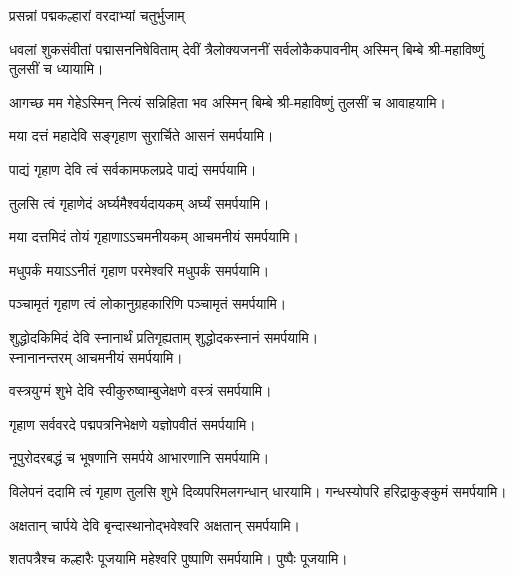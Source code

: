 \begin{center}

{प्रसन्नां पद्मकल्हारां वरदाभ्यां चतुर्भुजाम्}

{धवलां शुकसंवीतां पद्मासननिषेविताम्}
{देवीं त्रैलोक्यजननीं सर्वलोकैकपावनीम्}
अस्मिन् बिम्बे श्री-महाविष्णुं तुलसीं च ध्यायामि।

{आगच्छ मम गेहेऽस्मिन् नित्यं सन्निहिता भव}
अस्मिन् बिम्बे श्री-महाविष्णुं तुलसीं च आवाहयामि।
\medskip

\medskip
{}
{मया दत्तं महादेवि सङ्गृहाण सुरार्चिते}
 आसनं समर्पयामि।\medskip

{पाद्यं गृहाण देवि त्वं सर्वकामफलप्रदे}
 पाद्यं समर्पयामि।\medskip

{तुलसि त्वं गृहाणेदं अर्घ्यमैश्वर्यदायकम्}
 अर्घ्यं समर्पयामि।\medskip

{मया दत्तमिदं तोयं गृहाणाऽऽचमनीयकम्}
 आचमनीयं समर्पयामि।\medskip

{मधुपर्कं मयाऽऽनीतं गृहाण परमेश्वरि}
मधुपर्कं समर्पयामि।\medskip

{पञ्चामृतं गृहाण त्वं लोकानुग्रहकारिणि}
पञ्चामृतं समर्पयामि।\medskip


{शुद्धोदकिमिदं देवि स्नानार्थं प्रतिगृह्यताम्}
 शुद्धोदकस्नानं समर्पयामि।\\
स्नानानन्तरम् आचमनीयं समर्पयामि।\medskip

 {वस्त्रयुग्मं शुभे देवि स्वीकुरुष्वाम्बुजेक्षणे}
 वस्त्रं समर्पयामि।\medskip

{गृहाण सर्ववरदे पद्मपत्रनिभेक्षणे}
 यज्ञोपवीतं समर्पयामि।\medskip

{नूपुरोदरबद्धं च भूषणानि समर्पये}
आभारणानि समर्पयामि।\medskip
 
{विलेपनं ददामि त्वं गृहाण तुलसि शुभे}
 दिव्यपरिमलगन्धान् धारयामि। गन्धस्योपरि हरिद्राकुङ्कुमं समर्पयामि। 

{अक्षतान् चार्पये देवि बृन्दास्थानोद्भवेश्वरि}
अक्षतान् समर्पयामि।\medskip

{शतपत्रैश्च कल्हारैः पूजयामि महेश्वरि}
 पुष्पाणि समर्पयामि। पुष्पैः पूजयामि।
\end{center}

